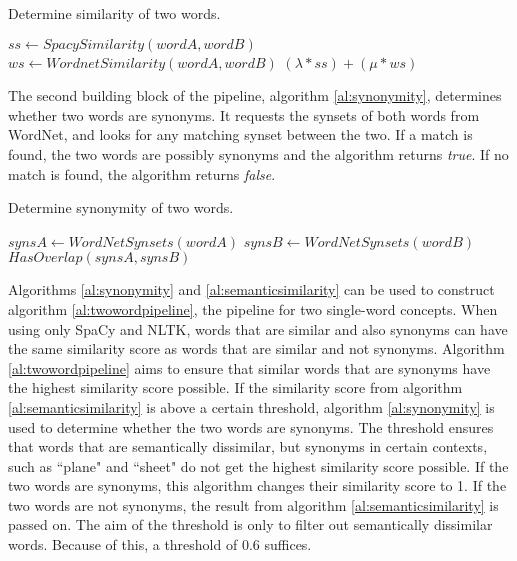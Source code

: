 \documentclass{article}
\begin{document}
\begin{algorithm}
\caption{Determine similarity of two words.}\label{al:semanticsimilarity}
\begin{algorithmic}[1]
		\State $\textit{ss} \gets \textit{SpacySimilarity}(wordA, wordB)$
		\State $\textit{ws} \gets \textit{WordnetSimilarity}(wordA, wordB)$
		\State \Return $(\lambda*ss)+(\mu*ws)$
	\EndProcedure
\end{algorithmic}
\end{algorithm}

The second building block of the pipeline, algorithm \ref{al:synonymity}, determines whether two words are synonyms. It requests the synsets of both words from WordNet, and looks for any matching synset between the two. If a match is found, the two words are possibly synonyms and the algorithm returns \textit{true}. If no match is found, the algorithm returns \textit{false}.

\begin{algorithm}
\caption{Determine synonymity of two words.}\label{al:synonymity}
\begin{algorithmic}[1]
		\State $\textit{synsA} \gets \textit{WordNetSynsets}(wordA)$
		\State $\textit{synsB} \gets \textit{WordNetSynsets}(wordB)$
		\State \Return $\textit{HasOverlap}(synsA, synsB)$
	\EndProcedure
\end{algorithmic}
\end{algorithm}

Algorithms \ref{al:synonymity} and \ref{al:semanticsimilarity} can be used to construct algorithm \ref{al:twowordpipeline}, the pipeline for two single-word concepts.  When using only SpaCy and NLTK, words that are similar and also synonyms can have the same similarity score as words that are similar and not synonyms. Algorithm \ref{al:twowordpipeline} aims to ensure that similar words that are synonyms have the highest similarity score possible. If the similarity score from algorithm \ref{al:semanticsimilarity} is above a certain threshold, algorithm \ref{al:synonymity} is used to determine whether the two words are synonyms. The threshold ensures that words that are semantically dissimilar, but synonyms in certain contexts, such as ``plane" and ``sheet" do not get the highest similarity score possible. If the two words are synonyms, this algorithm changes their similarity score to 1. If the two words are not synonyms, the result from algorithm \ref{al:semanticsimilarity} is passed on. The aim of the threshold is only to filter out semantically dissimilar words. Because of this, a threshold of 0.6 suffices.
\end{document}
